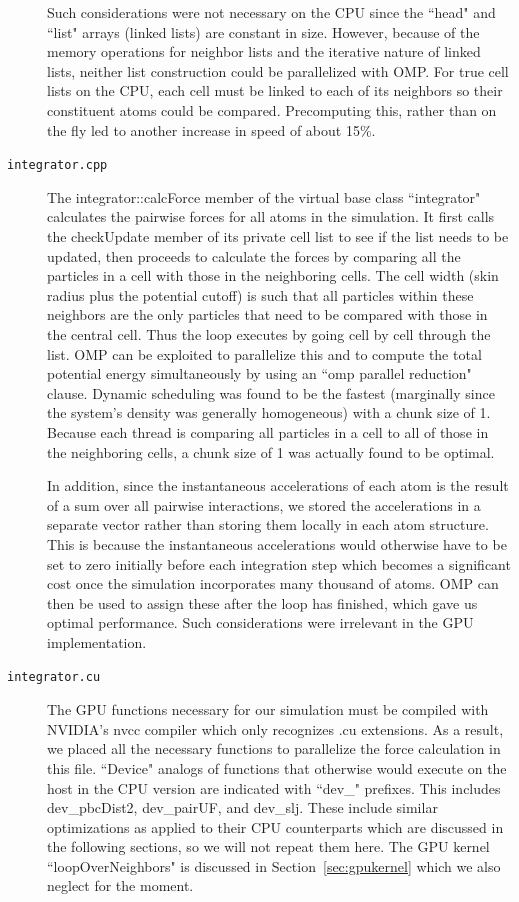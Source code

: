 \documentclass[12pt]{article}
\begin{document}
\begin{description}
Such considerations were not necessary on the CPU since the ``head" and ``list" arrays (linked lists) are constant in size.  However, because of the memory operations for neighbor lists and the iterative nature of linked lists, neither list construction could be parallelized with OMP.  For true cell lists on the CPU, each cell must be linked to each of its neighbors so their constituent atoms could be compared.  Precomputing this, rather than on the fly led to another increase in speed of about 15\%.

\item[\texttt{integrator.cpp}]
The integrator::calcForce member of the virtual base class ``integrator" calculates the pairwise forces for all atoms in the simulation.  It first calls the checkUpdate member of its private cell list to see if the list needs to be updated, then proceeds to calculate the forces by comparing all the particles in a cell with those in the neighboring cells.  The cell width (skin radius plus the potential cutoff) is such that all particles within these neighbors are the only particles that need to be compared with those in the central cell.  Thus the loop executes by going cell by cell through the list.  OMP can be exploited to parallelize this and to compute the total potential energy simultaneously by using an ``omp parallel reduction" clause.  Dynamic scheduling was found to be the fastest (marginally since the system's density was generally homogeneous) with a chunk size of 1.  Because each thread is comparing all particles in a cell to all of those in the neighboring cells, a chunk size of 1 was actually found to be optimal.

In addition, since the instantaneous accelerations of each atom is the result of a sum over all pairwise interactions, we stored the accelerations in a separate vector rather than storing them locally in each atom structure.  This is because the instantaneous accelerations would otherwise have to be set to zero initially before each integration step which becomes a significant cost once the simulation incorporates many thousand of atoms.  OMP can then be used to assign these after the loop has finished, which gave us optimal performance.  Such considerations were irrelevant in the GPU implementation.

\item[\texttt{integrator.cu}]
The GPU functions necessary for our simulation must be compiled with NVIDIA's nvcc compiler which only recognizes .cu extensions.  As a result, we placed all the necessary functions to parallelize the force calculation in this file.  ``Device" analogs of functions that otherwise would execute on the host in the CPU version are indicated with ``dev\_" prefixes.  This includes dev\_pbcDist2, dev\_pairUF, and dev\_slj.  These include similar optimizations as applied to their CPU counterparts which are discussed in the following sections, so we will not repeat them here.  The GPU kernel ``loopOverNeighbors" is discussed in Section~\ref{sec:gpukernel} which we also neglect for the moment.


\end{description}
\end{document}
